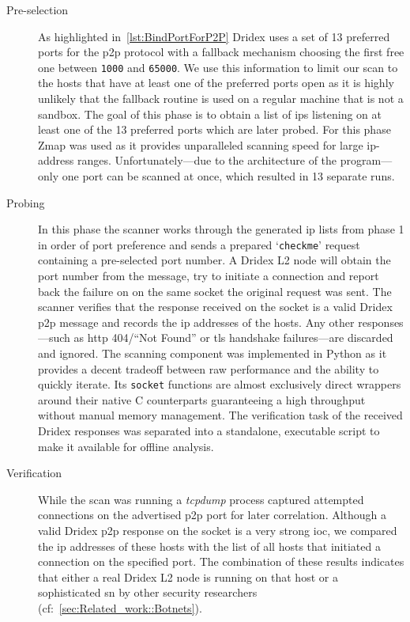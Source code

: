 \begin{description}
    \item[Pre-selection]
    As highlighted in~\autoref{lst:BindPortForP2P} Dridex uses a set of 13 preferred ports for the \gls{p2p} protocol with a fallback mechanism choosing the first free one between \texttt{1000} and \texttt{65000}.
    We use this information to limit our scan to the hosts that have at least one of the preferred ports open as it is highly unlikely that the fallback routine is used on a regular machine that is not a \gls{sandbox}.
    The goal of this phase is to obtain a list of \glspl{ip} listening on at least one of the 13 preferred ports which are later probed.
    For this phase Zmap was used as it provides unparalleled scanning speed for large \gls{ip}-address ranges.
    Unfortunately---due to the architecture of the program---only one port can be scanned at once, which resulted in 13 separate runs.
    \item[Probing]
    In this phase the scanner works through the generated \gls{ip} lists from phase 1 in order of port preference and sends a prepared `\texttt{checkme}' request containing a pre-selected port number.
    A Dridex L2 node will obtain the port number from the message, try to initiate a connection and report back the failure on on the same socket the original request was sent.
    The scanner verifies that the response received on the socket is a valid Dridex \gls{p2p} message and records the \gls{ip} addresses of the hosts.
    Any other responses---such as \gls{http} 404/``Not Found'' or \gls{tls} handshake failures---are discarded and ignored.
    The scanning component was implemented in Python as it provides a decent tradeoff between raw performance and the ability to quickly iterate.
    Its \lstinline|socket| functions are almost exclusively direct wrappers around their native C counterparts guaranteeing a high throughput without manual memory management.
    The verification task of the received Dridex responses was separated into a standalone, executable script to make it available for offline analysis.
    \item[Verification]
    While the scan was running a \emph{tcpdump} process captured attempted connections on the advertised \gls{p2p} port for later correlation.
    Although a valid Dridex \gls{p2p} response on the socket is a very strong \gls{ioc}, we compared the \gls{ip} addresses of these hosts with the list of all hosts that initiated a connection on the specified port.
    The combination of these results indicates that either a real Dridex L2 node is running on that host or a sophisticated \gls{sn} by other security researchers (cf:~\autoref{sec:Related_work::Botnets}).
\end{description}

